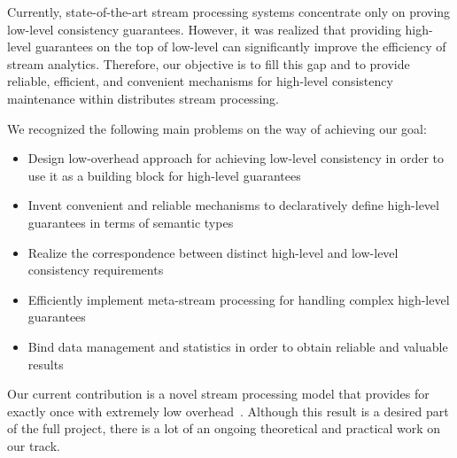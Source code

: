 \label{fs-phd-summary}

Currently, state-of-the-art stream processing systems concentrate only on proving low-level consistency guarantees. However, it was realized that providing high-level guarantees on the top of low-level can significantly improve the efficiency of stream analytics. Therefore, our objective is to fill this gap and to provide reliable, efficient, and convenient mechanisms for high-level consistency maintenance within distributes stream processing.

We recognized the following main problems on the way of achieving our goal:

\begin{itemize}
    \item Design low-overhead approach for achieving low-level consistency in order to use it as a building block for high-level guarantees  
    \item Invent convenient and reliable mechanisms to declaratively define high-level guarantees in terms of semantic types
    \item Realize the correspondence between distinct high-level and low-level consistency requirements
    \item Efficiently implement meta-stream processing for handling complex high-level guarantees
    \item Bind data management and statistics in order to obtain reliable and valuable results  
\end{itemize}

Our current contribution is a novel stream processing model that provides for exactly once with extremely low overhead~\cite{we2018seim, we2018beyondmr}. Although this result is a desired part of the full project, there is a lot of an ongoing theoretical and practical work on our track.   